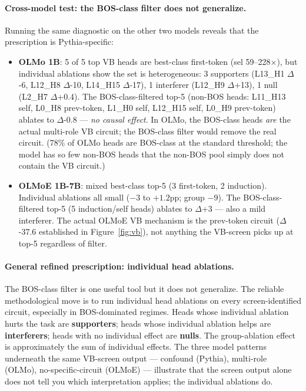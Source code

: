 \documentclass[11pt]{article}
\begin{document}
\paragraph{Cross-model test: the BOS-class filter does not generalize.}
Running the same diagnostic on the other two models reveals that the prescription is Pythia-specific:
\begin{itemize}[topsep=2pt,itemsep=2pt]
\item \textbf{OLMo 1B}: 5 of 5 top VB heads are best-class first-token (sel 59--228$\times$), but individual ablations show the set is heterogeneous: 3 supporters (L13\_H1 $\Delta$-6, L12\_H8 $\Delta$-10, L14\_H15 $\Delta$-17), 1 interferer (L12\_H9 $\Delta$+13), 1 null (L2\_H7 $\Delta$+0.4). The BOS-class-filtered top-5 (non-BOS heads: L11\_H13 self, L0\_H8 prev-token, L1\_H0 self, L12\_H15 self, L0\_H9 prev-token) ablates to $\Delta$-0.8 --- \emph{no causal effect}. In OLMo, the BOS-class heads \emph{are} the actual multi-role VB circuit; the BOS-class filter would remove the real circuit. (78\% of OLMo heads are BOS-class at the standard threshold; the model has so few non-BOS heads that the non-BOS pool simply does not contain the VB circuit.)
\item \textbf{OLMoE 1B-7B}: mixed best-class top-5 (3 first-token, 2 induction). Individual ablations all small ($-3$ to $+1.2$pp; group $-9$). The BOS-class-filtered top-5 (5 induction/self heads) ablates to $\Delta$+3 --- also a mild interferer. The actual OLMoE VB mechanism is the prev-token circuit ($\Delta$-37.6 established in Figure~\ref{fig:vb}), not anything the VB-screen picks up at top-5 regardless of filter.
\end{itemize}

\paragraph{General refined prescription: individual head ablations.}
The BOS-class filter is one useful tool but it does not generalize. The reliable methodological move is to run individual head ablations on every screen-identified circuit, especially in BOS-dominated regimes. Heads whose individual ablation hurts the task are \textbf{supporters}; heads whose individual ablation helps are \textbf{interferers}; heads with no individual effect are \textbf{nulls}. The group-ablation effect is approximately the sum of individual effects. The three model patterns underneath the same VB-screen output --- confound (Pythia), multi-role (OLMo), no-specific-circuit (OLMoE) --- illustrate that the screen output alone does not tell you which interpretation applies; the individual ablations do.
\end{document}
